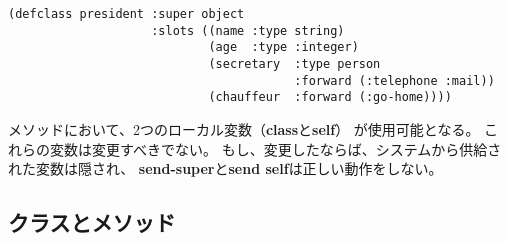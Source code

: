 \begin{verbatim}
(defclass president :super object
                    :slots ((name :type string)
                            (age  :type :integer)
                            (secretary  :type person
                                        :forward (:telephone :mail))
                            (chauffeur  :forward (:go-home))))
\end{verbatim}

メソッドにおいて、2つのローカル変数（{\bf class}と{\bf self}）
が使用可能となる。
これらの変数は変更すべきでない。
もし、変更したならば、システムから供給された変数は隠され、
{\bf send-super}と{\bf send self}は正しい動作をしない。


\subsection{クラスとメソッド}

